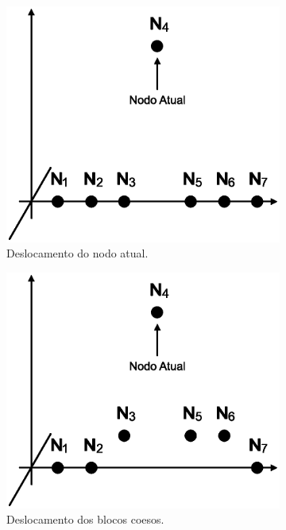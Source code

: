 \begin{figure}
	\begin{subfigure}{.5\textwidth}
  		\centering
  		\includegraphics[width=.9\linewidth]{figuras/nodos1.eps}
  		\caption{Deslocamento do nodo atual.}
  		\label{fig:subnodos1}
	\end{subfigure}
	\begin{subfigure}{.5\textwidth}
  		\centering
  		\includegraphics[width=.9\linewidth]{figuras/nodos2.eps}
  		\caption{Deslocamento dos blocos coesos.}
  		\label{fig:subnodos2}
	\end{subfigure}
	\begin{subfigure}{.5\textwidth}

\end{subfigure}
\end{figure}
